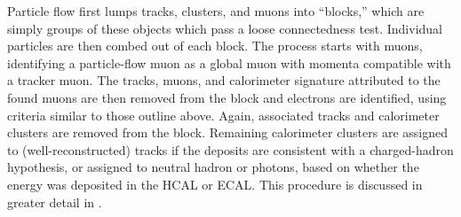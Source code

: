 Particle flow first lumps tracks, clusters, and muons into ``blocks,'' which are
simply groups of these objects which pass a loose connectedness test. Individual
particles are then combed out of each block. The process starts with muons,
identifying a particle-flow muon as a global muon with momenta compatible with a
tracker muon. The tracks, muons, and calorimeter signature attributed to the
found muons are then removed from the block and electrons are identified, using
criteria similar to those outline above. Again, associated tracks and
calorimeter clusters are removed from the block. Remaining calorimeter clusters
are assigned to (well-reconstructed) tracks if the deposits are consistent with
a charged-hadron hypothesis, or assigned to neutral hadron or photons, based on
whether the energy was deposited in the HCAL or ECAL. This procedure is
discussed in greater detail in \cite{pflow}.


